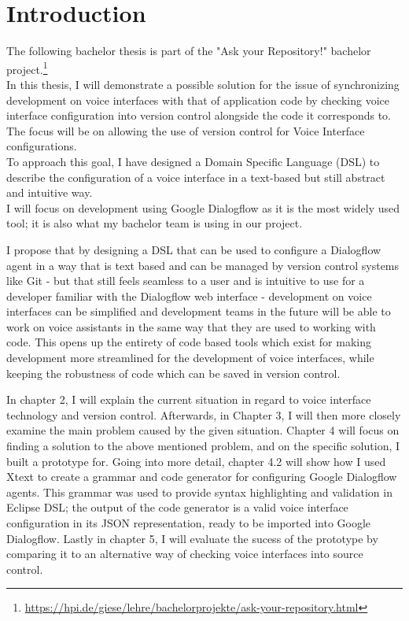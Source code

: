 
\chapter{Introduction}

The following bachelor thesis is part of the "Ask your Repository!" bachelor project.\footnote{\url{https://hpi.de/giese/lehre/bachelorprojekte/ask-your-repository.html}}\\
In this thesis, I will demonstrate a possible solution for the issue of synchronizing development on voice interfaces with that of application code by checking voice interface configuration into version control alongside the code it corresponds to. The focus will be on allowing the use of version control for Voice Interface configurations.\\
To approach this goal, I have designed a Domain Specific Language (DSL) to describe the configuration of a voice interface in a text-based but still abstract and intuitive way. \\
I will focus on development using Google Dialogflow as it is the most widely used tool; it is also what my bachelor team is using in our project. \citeNeeded

I propose that by designing a DSL that can be used to configure a Dialogflow agent in a way that is text based and can be managed by version control systems like Git - but that still feels seamless to a user and is intuitive to use for a developer familiar with the Dialogflow web interface - development on voice interfaces can be simplified and development teams in the future will be able to work on voice assistants in the same way that they are used to working with code. This opens up the entirety of code based tools which exist for making development more streamlined for the development of voice interfaces, while keeping the robustness of code which can be saved in version control.

In chapter 2, I will explain the current situation in regard to voice interface technology and version control. Afterwards, in Chapter 3, I will then more closely examine the main problem caused by the given situation.
Chapter 4 will focus on finding a solution to the above mentioned problem, and on the specific solution, I built a prototype for. Going into more detail, chapter 4.2 will show how I used Xtext to create a grammar and code generator for configuring Google Dialogflow agents. This grammar was used to provide syntax highlighting and validation in Eclipse DSL; the output of the code generator is a valid voice interface configuration in its JSON representation, ready to be imported into Google Dialogflow.
Lastly in chapter 5, I will evaluate the sucess of the prototype by comparing it to an alternative way of checking voice interfaces into source control. 

